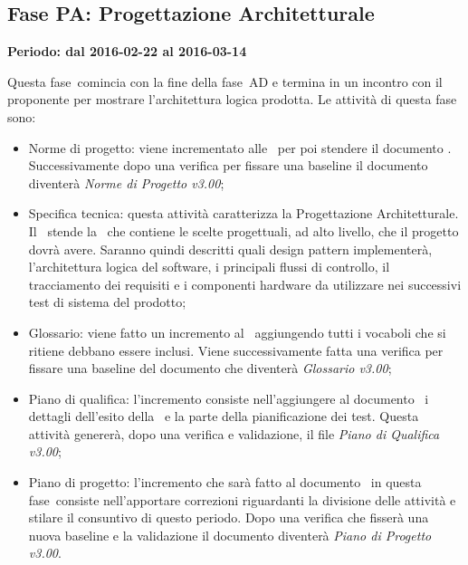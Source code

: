 \documentclass[../PianoProgetto.tex]{subfiles}
\begin{document}
	\subsection{Fase PA: Progettazione Architetturale}
		\textbf{Periodo: dal 2016-02-22 al 2016-03-14}
		
		Questa fase\g\ comincia con la fine della fase\g\ AD e termina in un incontro con il proponente per mostrare l'architettura logica prodotta. Le attività di questa fase sono:
		\begin{itemize}
			\item Norme di progetto: viene incrementato alle \normediprogetto\ per poi stendere il documento \specificatecnica . Successivamente dopo una verifica per fissare una baseline il documento diventerà \textit{Norme di Progetto v3.00};

			\item Specifica tecnica: questa attività caratterizza la Progettazione Architetturale. Il \progettista\ stende la \specificatecnica\ che contiene le scelte progettuali, ad alto livello, che il progetto dovrà avere. Saranno quindi descritti quali design pattern implementerà, l'architettura logica del software\g , i principali flussi di controllo, il tracciamento dei requisiti e i componenti hardware da utilizzare nei successivi test di sistema del prodotto;

			\item Glossario: viene fatto un incremento al \glossario\ aggiungendo tutti i vocaboli che si ritiene debbano essere inclusi. Viene successivamente fatta una verifica per fissare una baseline del documento che diventerà \textit{Glossario v3.00};

 			\item Piano di qualifica: l'incremento consiste nell'aggiungere al documento \pianodiqualifica\ i dettagli dell'esito della \revisionedeirequisiti\ e la parte della pianificazione dei test. Questa attività genererà, dopo una verifica e validazione, il file \textit{Piano di Qualifica v3.00};

			\item Piano di progetto: l'incremento che sarà fatto al documento \pianodiprogetto\ in questa fase\g\ consiste nell'apportare correzioni riguardanti la divisione delle attività e stilare il consuntivo di questo periodo. Dopo una verifica che fisserà una nuova baseline e la validazione il documento diventerà \textit{Piano di Progetto v3.00}.
						
		\end{itemize}
		
\end{document}
